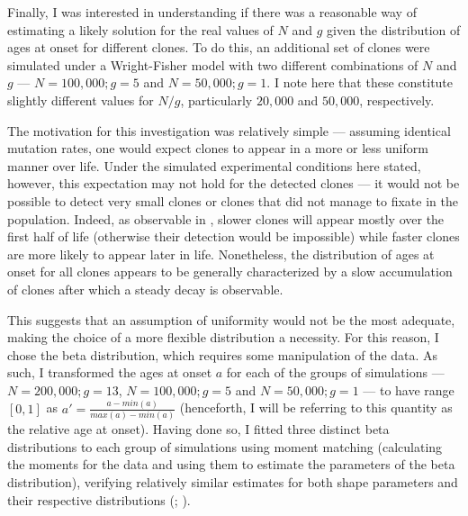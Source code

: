 \begin{figure}[!ht]
	\label{fig:age-at-onset-mae}
\end{figure}

Finally, I was interested in understanding if there was a reasonable way of estimating a likely solution for the real values of $N$ and $g$ given the distribution of ages at onset for different clones. To do this, an additional set of clones were simulated under a Wright-Fisher model with two different combinations of $N$ and $g$ --- $N=100,000;g=5$ and $N=50,000;g=1$. I note here that these constitute slightly different values for $N/g$, particularly $20,000$ and $50,000$, respectively. 

The motivation for this investigation was relatively simple --- assuming identical mutation rates, one would expect clones to appear in a more or less uniform manner over life. Under the simulated experimental conditions here stated, however, this expectation may not hold for the detected clones --- it would not be possible to detect very small clones or clones that did not manage to fixate in the population. Indeed, as observable in , slower clones will appear mostly over the first half of life (otherwise their detection would be impossible) while faster clones are more likely to appear later in life. Nonetheless, the distribution of ages at onset for all clones appears to be generally characterized by a slow accumulation of clones after which a steady decay is observable.

\begin{figure}[!ht]
	\label{fig:real-age-at-onset-distribution}
\end{figure}

This suggests that an assumption of uniformity would not be the most adequate, making the choice of a more flexible distribution a necessity. For this reason, I chose the beta distribution, which requires some manipulation of the data. As such, I transformed the ages at onset $a$ for each of the groups of simulations --- $N=200,000;g=13$, $N=100,000;g=5$ and $N=50,000;g=1$ --- to have range $[0,1]$ as $a' = \frac{a-min(a)}{max(a)-min(a)}$ (henceforth, I will be referring to this quantity as the relative age at onset). Having done so, I fitted three distinct beta distributions to each group of simulations using moment matching (calculating the moments for the data and using them to estimate the parameters of the beta distribution), verifying relatively similar estimates for both shape parameters and their respective distributions (; ). 

